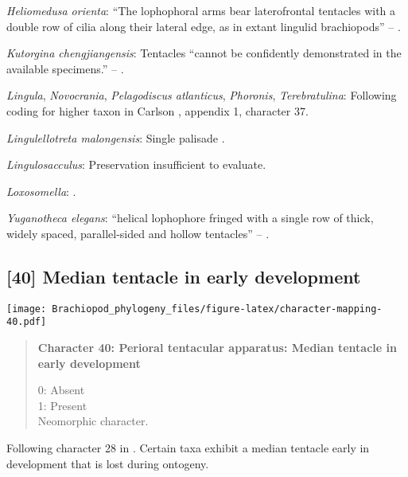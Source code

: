 \documentclass[openany]{book}
\theoremstyle{definition}
\theoremstyle{definition}
\theoremstyle{definition}
\theoremstyle{remark}
\begin{document}
\hypertarget{Heliomedusa_orienta-coding-39}{}
\emph{Heliomedusa orienta}: ``The lophophoral arms bear laterofrontal
tentacles with a double row of cilia along their lateral edge, as in
extant lingulid brachiopods'' -- \citet{Zhang2009Architectureand}.

\hypertarget{Kutorgina_chengjiangensis-coding-39}{}
\emph{Kutorgina chengjiangensis}: Tentacles ``cannot be confidently
demonstrated in the available specimens.'' --
\citet{Zhang2007Rhynchonelliformeanbrachiopods}.

\hypertarget{Lingula-coding-39}{}
\emph{Lingula}, \emph{Novocrania}, \emph{Pelagodiscus atlanticus},
\emph{Phoronis}, \emph{Terebratulina}: Following coding for higher taxon
in Carlson \citeyearpar{Carlson1995Phylogeneticrelationships}, appendix
1, character 37.

\hypertarget{Lingulellotreta_malongensis-coding-39}{}
\emph{Lingulellotreta malongensis}: Single palisade
\citep{Zhang2004Newdata}.

\hypertarget{Lingulosacculus-coding-39}{}
\emph{Lingulosacculus}: Preservation insufficient to evaluate.

\hypertarget{Loxosomella-coding-39}{}
\emph{Loxosomella}: \citet{Nielsen1966}.

\hypertarget{Yuganotheca_elegans-coding-39}{}
\emph{Yuganotheca elegans}: ``helical lophophore fringed with a single
row of thick, widely spaced, parallel-sided and hollow tentacles'' --
\citet{Zhang2014Anearly}.

\subsection*{{[}40{]} Median tentacle in early
development}\label{median-tentacle-in-early-development}

\texttt{[image: Brachiopod\_phylogeny\_files/figure-latex/character-mapping-40.pdf]}

\begin{quote}
\textbf{Character 40: Perioral tentacular apparatus: Median tentacle in
early development}

0: Absent\\
1: Present\\
Neomorphic character.
\end{quote}

Following character 28 in \citet{Carlson1995Phylogeneticrelationships}.
Certain taxa exhibit a median tentacle early in development that is lost
during ontogeny.
\end{document}

